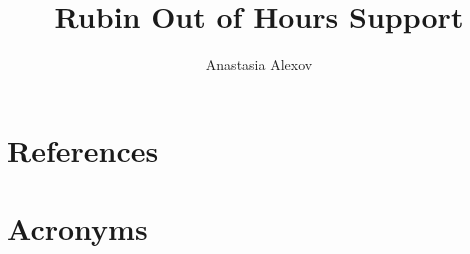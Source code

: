 \documentclass[OPS,authoryear,toc]{lsstdoc}
\title{Rubin Out of Hours Support}
\author{%
Anastasia Alexov
}
\date{\vcsDate}
\begin{document}
\maketitle


\appendix
\section{References} \label{sec:bib}
\renewcommand{\refname}{} %


\section{Acronyms} \label{sec:acronyms}

\end{document}
